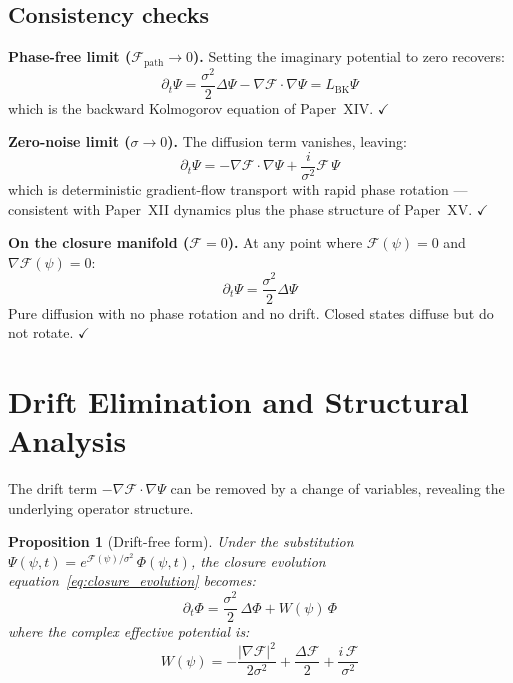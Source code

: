 \documentclass[12pt]{article}
\newtheorem{proposition}[theorem]{Proposition}
\newcommand{\Fcal}{\mathcal{F}}
\begin{document}
\subsection{Consistency checks}

\textbf{Phase-free limit ($\Fcal_{\mathrm{path}} \to 0$).} Setting the imaginary potential to zero recovers:
\begin{equation}
    \partial_t \Psi = \frac{\sigma^2}{2}\Delta\Psi - \nabla\Fcal \cdot \nabla\Psi = L_{\mathrm{BK}}\Psi
\end{equation}
which is the backward Kolmogorov equation of Paper~XIV. $\checkmark$

\textbf{Zero-noise limit ($\sigma \to 0$).} The diffusion term vanishes, leaving:
\begin{equation}
    \partial_t \Psi = -\nabla\Fcal \cdot \nabla\Psi + \frac{i}{\sigma^2}\Fcal\,\Psi
\end{equation}
which is deterministic gradient-flow transport with rapid phase rotation --- consistent with Paper~XII dynamics plus the phase structure of Paper~XV. $\checkmark$

\textbf{On the closure manifold ($\Fcal = 0$).} At any point where $\Fcal(\psi) = 0$ and $\nabla\Fcal(\psi) = 0$:
\begin{equation}
    \partial_t \Psi = \frac{\sigma^2}{2}\Delta\Psi
\end{equation}
Pure diffusion with no phase rotation and no drift. Closed states diffuse but do not rotate. $\checkmark$

\section{Drift Elimination and Structural Analysis}\label{sec:drift}

The drift term $-\nabla\Fcal \cdot \nabla\Psi$ can be removed by a change of variables, revealing the underlying operator structure.

\begin{proposition}[Drift-free form]\label{prop:driftfree}
Under the substitution $\Psi(\psi,t) = e^{\Fcal(\psi)/\sigma^2}\, \Phi(\psi,t)$, the closure evolution equation~\eqref{eq:closure_evolution} becomes:
\begin{equation}\label{eq:driftfree}
    \partial_t \Phi = \frac{\sigma^2}{2}\,\Delta\Phi + W(\psi)\,\Phi
\end{equation}
where the complex effective potential is:
\begin{equation}\label{eq:W}
    W(\psi) = -\frac{|\nabla\Fcal|^2}{2\sigma^2} + \frac{\Delta\Fcal}{2} + \frac{i\,\Fcal}{\sigma^2}
\end{equation}
\end{proposition}
\end{document}
